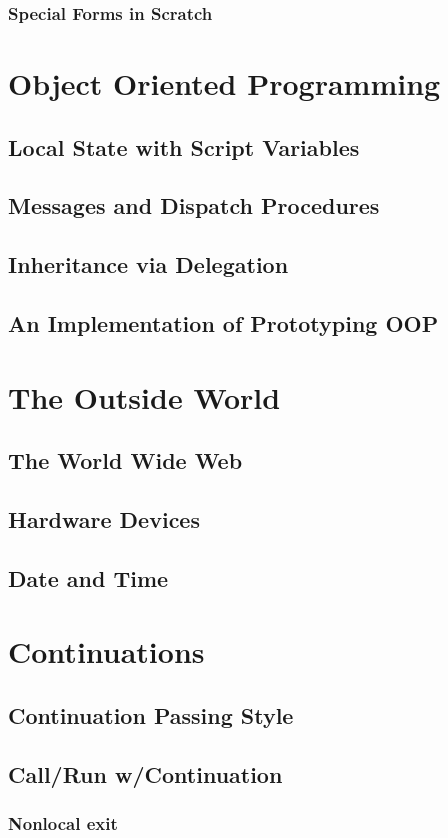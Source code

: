 \documentclass{report}
\begin{document}
\subsection{Special Forms in Scratch}
\chapter{Object Oriented Programming}
\section{Local State with Script Variables}
\section{Messages and Dispatch Procedures}
\section{Inheritance via Delegation}
\section{An Implementation of Prototyping OOP}
\chapter{The Outside World}
\section{The World Wide Web}
\section{Hardware Devices}
\section{Date and Time}
\chapter{Continuations}
\section{Continuation Passing Style}
\section{Call/Run w/Continuation}
\subsection{Nonlocal exit}
\end{document}

